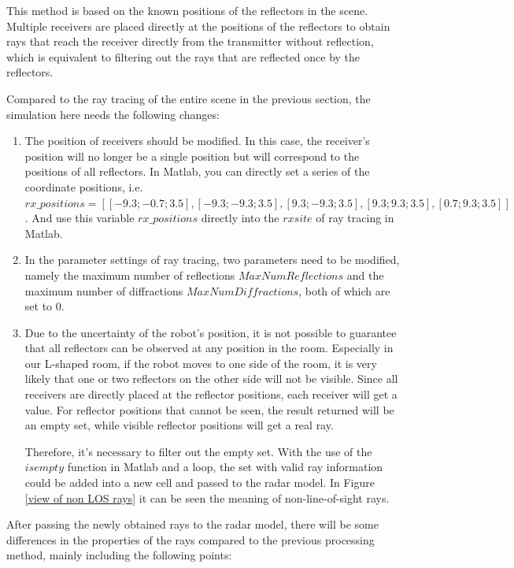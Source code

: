 \documentclass[12pt,DIV14,BCOR12mm,a4paper,footinclude=false,headinclude,parskip=half-,twoside,openright,cleardoublepage=empty,toc=index,bibliography=totoc,listof=totoc]{scrreprt}
\numberwithin{equation}{chapter}
\begin{document}
This method is based on the known positions of the reflectors in the scene. Multiple receivers are placed directly at the positions of the reflectors to obtain rays that reach the receiver directly from the transmitter without reflection, which is equivalent to filtering out the rays that are reflected once by the reflectors.

Compared to the ray tracing of the entire scene in the previous section, the simulation here needs the following changes:

\begin{enumerate}[label=\textbullet]
    \item The position of receivers should be modified. In this case, the receiver's position will no longer be a single position but will correspond to the positions of all reflectors. In Matlab, you can directly set a series of the coordinate positions, i.e. $rx\_positions = [[-9.3;-0.7;3.5], [-9.3;-9.3;3.5], [9.3;-9.3;3.5], [9.3;9.3;3.5], [0.7;9.3;3.5]]$. And use this variable $rx\_positions$ directly into the $rxsite$ of ray tracing in Matlab.

    \item In the parameter settings of ray tracing, two parameters need to be modified, namely the maximum number of reflections $MaxNumReflections$ and the maximum number of diffractions $MaxNumDiffractions$, both of which are set to 0.

    \item Due to the uncertainty of the robot's position, it is not possible to guarantee that all reflectors can be observed at any position in the room. Especially in our L-shaped room, if the robot moves to one side of the room, it is very likely that one or two reflectors on the other side will not be visible. Since all receivers are directly placed at the reflector positions, each receiver will get a value. For reflector positions that cannot be seen, the result returned will be an empty set, while visible reflector positions will get a real ray.

    Therefore, it's necessary to filter out the empty set. With the use of the $isempty$ function in Matlab and a loop, the set with valid ray information could be added into a new cell and passed to the radar model. In Figure \ref{view of non LOS rays} it can be seen the meaning of non-line-of-sight rays.
    
\end{enumerate}

After passing the newly obtained rays to the radar model, there will be some differences in the properties of the rays compared to the previous processing method, mainly including the following points:
\end{document}
